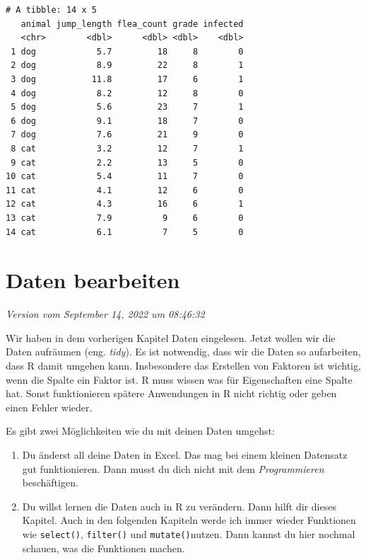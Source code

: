 \documentclass[
  letterpaper,
]{scrbook}
\providecommand{\tightlist}{%
  \setlength{\itemsep}{0pt}\setlength{\parskip}{0pt}}\usepackage{longtable,booktabs,array}
\begin{document}
\begin{verbatim}
# A tibble: 14 x 5
   animal jump_length flea_count grade infected
   <chr>        <dbl>      <dbl> <dbl>    <dbl>
 1 dog            5.7         18     8        0
 2 dog            8.9         22     8        1
 3 dog           11.8         17     6        1
 4 dog            8.2         12     8        0
 5 dog            5.6         23     7        1
 6 dog            9.1         18     7        0
 7 dog            7.6         21     9        0
 8 cat            3.2         12     7        1
 9 cat            2.2         13     5        0
10 cat            5.4         11     7        0
11 cat            4.1         12     6        0
12 cat            4.3         16     6        1
13 cat            7.9          9     6        0
14 cat            6.1          7     5        0
\end{verbatim}

\hypertarget{sec-dplyr}{%
\chapter{Daten bearbeiten}\label{sec-dplyr}}

\emph{Version vom September 14, 2022 um 08:46:32}

Wir haben in dem vorherigen Kapitel Daten eingelesen. Jetzt wollen wir
die Daten aufräumen (eng. \emph{tidy}). Es ist notwendig, dass wir die
Daten so aufarbeiten, dass R damit umgehen kann. Insbesondere das
Erstellen von Faktoren ist wichtig, wenn die Spalte ein Faktor ist. R
muss wissen was für Eigenschaften eine Spalte hat. Sonst funktionieren
spätere Anwendungen in R nicht richtig oder geben einen Fehler wieder.

Es gibt zwei Möglichkeiten wie du mit deinen Daten umgehst:

\begin{enumerate}
\def\labelenumi{\arabic{enumi})}
\tightlist
\item
  Du änderst all deine Daten in Excel. Das mag bei einem kleinen
  Datensatz gut funktionieren. Dann musst du dich nicht mit dem
  \emph{Programmieren} beschäftigen.
\item
  Du willst lernen die Daten auch in R zu verändern. Dann hilft dir
  dieses Kapitel. Auch in den folgenden Kapiteln werde ich immer wieder
  Funktionen wie \texttt{select()}, \texttt{filter()} und
  \texttt{mutate()}nutzen. Dann kannst du hier nochmal schauen, was die
  Funktionen machen.
\end{enumerate}
\end{document}
